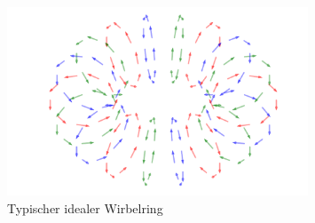 \begin{figure}
\centering
\includegraphics[width=0.8\textwidth]{papers/wirbelringe/fig/wirbelring_RGB.pdf}
\caption{Typischer idealer Wirbelring \label{buch:papers:Wirbelringe:fig:generell}}
\end{figure}